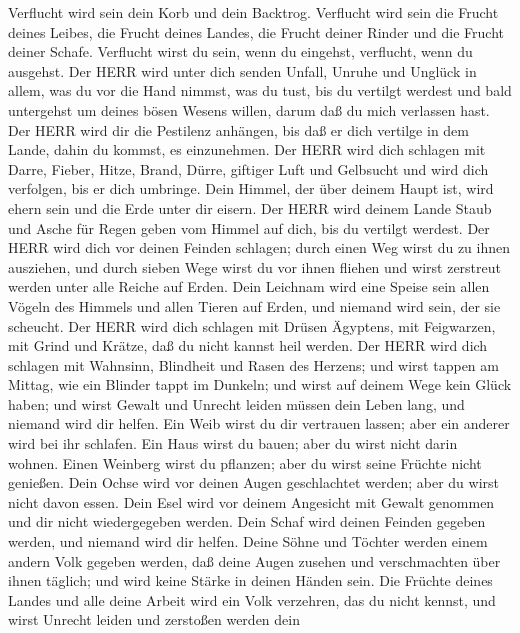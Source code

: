 Verflucht wird sein dein Korb und dein Backtrog.  Verflucht
wird sein die Frucht deines Leibes, die Frucht deines Landes, die Frucht
deiner Rinder und die Frucht deiner Schafe.  Verflucht
wirst du sein, wenn du eingehst, verflucht, wenn du ausgehst.
 Der HERR wird unter dich senden Unfall, Unruhe und Unglück
in allem, was du vor die Hand nimmst, was du tust, bis du vertilgt
werdest und bald untergehst um deines bösen Wesens willen, darum daß du
mich verlassen hast.  Der HERR wird dir die Pestilenz
anhängen, bis daß er dich vertilge in dem Lande, dahin du kommst, es
einzunehmen.  Der HERR wird dich schlagen mit Darre,
Fieber, Hitze, Brand, Dürre, giftiger Luft und Gelbsucht und wird dich
verfolgen, bis er dich umbringe.  Dein Himmel, der über
deinem Haupt ist, wird ehern sein und die Erde unter dir eisern.
 Der HERR wird deinem Lande Staub und Asche für Regen geben
vom Himmel auf dich, bis du vertilgt werdest.  Der HERR
wird dich vor deinen Feinden schlagen; durch einen Weg wirst du zu ihnen
ausziehen, und durch sieben Wege wirst du vor ihnen fliehen und wirst
zerstreut werden unter alle Reiche auf Erden.  Dein
Leichnam wird eine Speise sein allen Vögeln des Himmels und allen Tieren
auf Erden, und niemand wird sein, der sie scheucht.  Der
HERR wird dich schlagen mit Drüsen Ägyptens, mit Feigwarzen, mit Grind
und Krätze, daß du nicht kannst heil werden.  Der HERR wird
dich schlagen mit Wahnsinn, Blindheit und Rasen des Herzens;
 und wirst tappen am Mittag, wie ein Blinder tappt im
Dunkeln; und wirst auf deinem Wege kein Glück haben; und wirst Gewalt
und Unrecht leiden müssen dein Leben lang, und niemand wird dir helfen.
 Ein Weib wirst du dir vertrauen lassen; aber ein anderer
wird bei ihr schlafen. Ein Haus wirst du bauen; aber du wirst nicht
darin wohnen. Einen Weinberg wirst du pflanzen; aber du wirst seine
Früchte nicht genießen.  Dein Ochse wird vor deinen Augen
geschlachtet werden; aber du wirst nicht davon essen. Dein Esel wird vor
deinem Angesicht mit Gewalt genommen und dir nicht wiedergegeben werden.
Dein Schaf wird deinen Feinden gegeben werden, und niemand wird dir
helfen.  Deine Söhne und Töchter werden einem andern Volk
gegeben werden, daß deine Augen zusehen und verschmachten über ihnen
täglich; und wird keine Stärke in deinen Händen sein.  Die
Früchte deines Landes und alle deine Arbeit wird ein Volk verzehren, das
du nicht kennst, und wirst Unrecht leiden und zerstoßen werden dein
